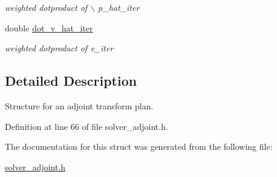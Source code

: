 \begin{CompactItemize}
\begin{CompactList}\small\item\em weighted dotproduct of $\backslash$ p\_\-hat\_\-iter \item\end{CompactList}\item 
\hypertarget{structinfct__adjoint__plan_o17}{
double \hyperlink{structinfct__adjoint__plan_o17}{dot\_\-v\_\-hat\_\-iter}}
\label{structinfct__adjoint__plan_o17}

\begin{CompactList}\small\item\em weighted dotproduct of v\_\-iter \item\end{CompactList}\end{CompactItemize}


\subsection{Detailed Description}
Structure for an adjoint transform plan. 



Definition at line 66 of file solver\_\-adjoint.h.

The documentation for this struct was generated from the following file:\begin{CompactItemize}
\item 
\hyperlink{solver__adjoint_8h}{solver\_\-adjoint.h}\end{CompactItemize}
